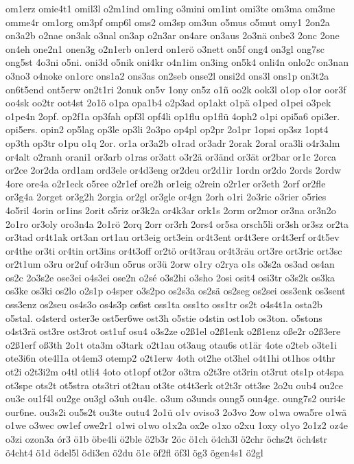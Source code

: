 {om1erz
omie4t1
omil3l
o2m1ind
om1ing
o3mini
om1int
omi3te
om3ma
om3me
omme4r
om1org
om3pf
omp6l
oms2
om3sp
om3un
o5mus
o5mut
omy1
2on2a
on3a2b
o2nae
on3ak
o3nal
on3ap
o2n3ar
on4are
on3aus
2o3nä
onbe3
2onc
2one
on4eh
one2n1
onen3g
o2n1erb
on1erd
on1erö
o3nett
on5f
ong4
on3gl
ong7sc
ong5st
4o3ni
o5ni.
oni3d
o5nik
oni4kr
o4n1im
on3ing
on5k4
onli4n
onlo2c
on3nan
o3no3
o4noke
on1orc
ons1a2
ons3as
on2seb
onse2l
onsi2d
ons3l
ons1p
on3t2a
on6t5end
ont5erw
on2t1ri
2onuk
on5v
1ony
on5z
o1ñ
oo2k
ook3l
o1op
o1or
oor3f
oo4sk
oo2tr
oot4st
2o1ö
o1pa
opa1b4
o2p3ad
op1akt
o1pä
o1ped
o1pei
o3pek
o1pe4n
2opf.
op2f1a
op3fah
opf3l
opf4li
op1flu
op1flü
4oph2
o1pi
opi5a6
opi3er.
opi5ers.
opin2
op5lag
op3le
op3li
2o3po
op4pl
op2pr
2o1pr
1opsi
op3sz
1opt4
op3th
op3tr
o1pu
o1q
2or.
or1a
or3a2b
o1rad
or3adr
2orak
2oral
ora3li
o4r3alm
or4alt
o2ranh
orani1
or3arb
o1ras
or3att
o3r2ä
or3änd
or3ät
or2bar
or1c
2orca
or2ce
2or2da
ord1am
ord3ele
or4d3eng
or2deu
or2d1ir
1ordn
or2do
2ords
2ordw
4ore
ore4a
o2r1eck
o5ree
o2r1ef
ore2h
or1eig
o2rein
o2r1er
or3eth
2orf
or2fle
or3g4a
2orget
or3g2h
2orgia
or2gl
or3gle
or4gn
2orh
o1ri
2o3ric
o3rier
o5ries
4o5ril
4orin
or1ins
2orit
o5riz
or3k2a
or4k3ar
ork1s
2orm
or2mor
or3na
or3n2o
2o1ro
or3oly
oro3n4a
2o1rö
2orq
2orr
or3rh
2ors4
or5sa
orsch5li
or3sh
or3sz
or2ta
or3tad
or4t1ak
ort3an
ort1au
ort3eig
ort3ein
or4t3ent
or4t3ere
or4t3erf
or4t5ev
or4the
or3ti
or4tin
ort3ins
or4t3off
or2tö
or4t3rau
or4t3räu
ort3re
ort3ric
ort3sc
or2t1um
o3ru
or2uf
o4r3un
o5rus
or3ü
2orw
o1ry
o2rya
o1s
o3s2a
os3ad
os4an
os2c
2o3s2e
ose3ei
o4s3ei
ose2n
o2sé
o3s2hi
o3sho
2osi
osit4
osi3tr
o3s2k
os3ka
os3ke
os3ki
os2lo
o2s1p
o4sper
o3s2po
os2s3a
os2sä
os2seg
os2sei
oss3enk
os3sent
oss3enz
os2seu
os4s3o
os4s3p
os6st
oss1ta
oss1to
oss1tr
os2t
o4s4t1a
osta2b
o5stal.
o4sterd
oster3e
ost5er6we
ost3h
o5stie
o4stin
ost1ob
os3ton.
o5stons
o4st3rä
ost3re
ost3rot
ost1uf
osu4
o3s2ze
o2ß1el
o2ß1enk
o2ß1enz
oße2r
o2ß3ere
o2ß1erf
oß3th
2o1t
ota3m
o3tark
o2t1au
ot3aug
otau6s
ot1är
4ote
o2teb
o3te1i
ote3i6n
ote4l1a
ot4em3
otemp2
o2t1erw
4oth
ot2he
ot3hel
o4t1hi
ot1hos
o4thr
ot2i
o2t3i2m
o4tl
otli4
4oto
ot1opf
ot2or
o3tra
o2t3re
ot3rin
ot3rut
ots1p
ot4spa
ot3spe
ots2t
ot5stra
ots3tri
ot2tau
ot3te
ot4t3erk
ot2t3r
ott3se
2o2u
oub4
ou2ce
ou3e
ou1f4l
ou2ge
ou3gl
o3uh
ou4le.
o3um
o3unds
oung5
oun4ge.
oung7s2
ouri4e
our6ne.
ou3s2i
ou5s2t
ou3te
outu4
2o1ü
o1v
oviso3
2o3vo
2ow
o1wa
owa5re
o1wä
o1we
o3wec
ow1ef
owe2r1
o1wi
o1wo
o1x2a
ox2e
o1xo
o2xu
1oxy
o1yo
2o1z2
oz4e
o3zi
ozon3a
ór3
ö1b
öbe4li
ö2ble
ö2b3r
2öc
ö1ch
ö4ch3l
ö2chr
öchs2t
öch4str
ö4cht4
ö1d
ödel5l
ödi3en
ö2du
ö1e
öf2fl
öf3l
ög3
ögen4s1
ö2gl
}
